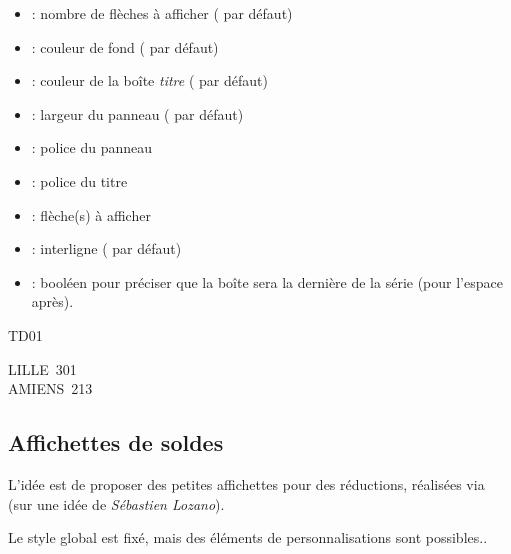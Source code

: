 \documentclass[french,11pt,a4paper]{article}
\begin{document}
\begin{itemize}
	\item {} : nombre de flèches à afficher ( par défaut)
	\item {} : couleur de fond ( par défaut)
	\item {} : couleur de la boîte \textit{titre} ( par défaut)
	\item {} : largeur du panneau (\MontreCode{10cm} par défaut)
	\item {} : police du panneau
	\item {} : police du titre
	\item {} : flèche(s) à afficher
	\item {} : interligne (\MontreCode{2.5mm} par défaut)
	\item {} : booléen pour préciser que la boîte sera la dernière de la série (pour l'espace après).
\end{itemize}

\begin{DemoCode}{}
\begin{PanneauAutoroute}[Largeur=\linewidth,Dernier=false]{TD01}
\end{PanneauAutoroute}

\begin{PanneauAutoroute}%
	[CouleurFond=olive,Fleches=2,Police=\bfseries\huge\fontfamily{phv}\selectfont]{}
	LILLE\hfill~301\\
	AMIENS\hfill~213
\end{PanneauAutoroute}
\end{DemoCode}

\pagebreak

\subsection{Affichettes de soldes}

L'idée est de proposer des petites affichettes pour des réductions, réalisées via  (sur une idée de \textit{Sébastien Lozano}).

Le style global est fixé, mais des éléments de personnalisations sont possibles..
\end{document}
